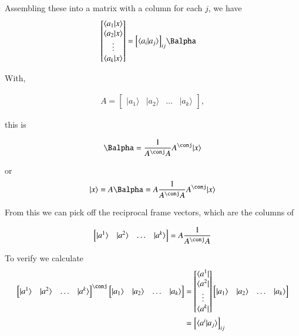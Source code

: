 \documentclass{article}
\newcommand{\ket}[1]{\lvert {#1} \rangle}
\newcommand{\bra}[1]{\langle {#1} \rvert}
\newcommand{\braket}[2]{\langle{#1} \vert {#2}\rangle}
\begin{document}
Assembling these into a matrix with a column for each $j$, we have
\begin{align*}
\begin{bmatrix}
\braket{a_1}{x} \\
\braket{a_2}{x} \\
\vdots \\
\braket{a_k}{x} \\
\end{bmatrix}
&=
{\begin{bmatrix}
\braket{a_i}{a_j}
\end{bmatrix}}_{ij}
\Balpha
\end{align*}

With,

\begin{align*}
A = 
\begin{bmatrix}
\ket{a_1} & \ket{a_2} & \hdots & \ket{a_k}
\end{bmatrix},
\end{align*}

this is

\begin{align*}
\Balpha = \inv{A^\conj A} A^\conj \ket{x}
\end{align*}

or 
\begin{align*}
\ket{x} = A \Balpha = A \inv{A^\conj A} A^\conj \ket{x}
\end{align*}

From this we can pick off the reciprocal frame vectors, which are the columns of 

\begin{align*}
\begin{bmatrix}
\ket{a^1} & \ket{a^2} & \hdots & \ket{a^k}
\end{bmatrix} = 
A \inv{A^\conj A}
\end{align*}

To verify we calculate 
\begin{align*}
{\begin{bmatrix}
\ket{a^1} & \ket{a^2} & \hdots & \ket{a^k}
\end{bmatrix}}^\conj
\begin{bmatrix}
\ket{a_1} & \ket{a_2} & \hdots & \ket{a_k}
\end{bmatrix}
&=
\begin{bmatrix}
\bra{a^1} \\ \bra{a^2} \\ \vdots \\ \bra{a^k}
\end{bmatrix}
\begin{bmatrix}
\ket{a_1} & \ket{a_2} & \hdots & \ket{a_k}
\end{bmatrix} \\
&= 
{
\begin{bmatrix}
\braket{a^i}{a_j}
\end{bmatrix}}_{ij}
\end{align*}
\end{document}
